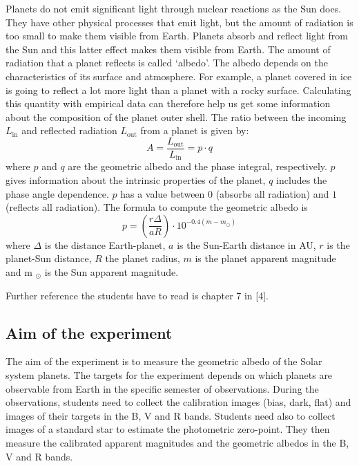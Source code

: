 \documentclass[a4paper, 11pt, fleqn]{memoir}
\begin{document}
Planets do not emit significant light through nuclear reactions as the Sun does.
They have other physical processes that emit light, but the amount of radiation is too small to make them visible from Earth.
Planets absorb and reflect light from the Sun and this latter effect makes them visible from Earth.
The amount of radiation that a planet reflects is called `albedo'.
The albedo depends on the characteristics of its surface and atmosphere.
For example, a planet covered in ice is going to reflect a lot more light than a planet with a rocky surface.
Calculating this quantity with empirical data can therefore help us get some information about the composition of the planet outer shell.
The ratio between the incoming $L_\text{in}$ and reflected radiation $L_\mathrm{out}$ from a planet is given by:
\begin{equation}
    A = \frac{L_\text{out}}{L_\text{in}} = p \cdot q
\end{equation}
where
$p$ and $q$ are the geometric albedo and the phase integral, respectively.
$p$ gives information about the intrinsic properties of the planet,
$q$ includes the phase angle dependence.
$p$ has a value between $0$ (absorbs all radiation) and $1$ (reflects all radiation).
The formula to compute the geometric albedo is
\begin{equation}
    p = \left ( \frac{r \Delta}{a R} \right) \cdot 10^{-0.4(m - m_{\odot})}
\end{equation}
where $\Delta$ is the distance Earth-planet,
$a$ is the Sun-Earth distance in AU,
$r$ is the planet-Sun distance,
$R$ the planet radius,
$m$ is the planet apparent magnitude and m
$_{\odot}$ is the Sun apparent magnitude.

Further reference the students have to read is chapter 7 in [4].

\subsection{Aim of the experiment}

The aim of the experiment is to measure the geometric albedo of the Solar system planets.
The targets for the experiment depends on which planets are observable from Earth in the specific semester of observations.
During the observations, students need to collect the calibration images (bias, dark, flat) and images of their targets in the B, V and R bands.
Students need also to collect images of a standard star to estimate the photometric zero-point.
They then measure the calibrated apparent magnitudes and the geometric albedos in the B, V and R bands.
\end{document}
